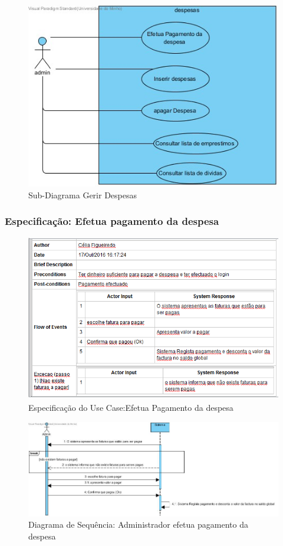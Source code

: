 \begin{figure}[htb!]
	\centering
	\includegraphics[scale=0.5]{imagens/UseCase/GerirDespesas}  
	\caption{Sub-Diagrama Gerir Despesas }  
\end{figure}

\subsubsection{Especificação: Efetua pagamento da despesa}

\begin{figure}[htb!]
	\centering
	\includegraphics[scale=0.6]{imagens/Especificacoes/efetuapagdespesa}  
	\caption{Especificação do Use Case:Efetua Pagamento da despesa  }  
\end{figure}

\begin{figure}[htb!]
	\centering
	\includegraphics[scale=0.5]{imagens/diagramaSeq/EfetuaPagamentoDespesa}  
	\caption{Diagrama de Sequência: Administrador efetua pagamento da despesa }  
\end{figure}



